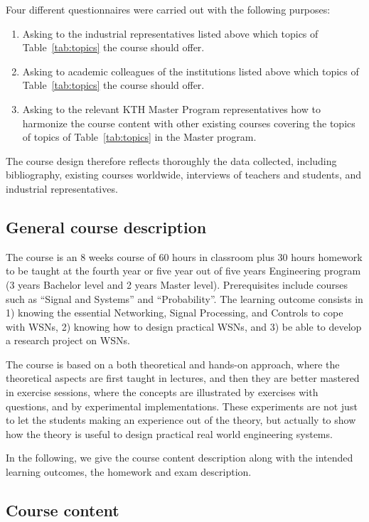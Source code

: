 \documentclass[onecolumn,12pt,draftclsnofoot,a4paper,peerreview]{IEEEtran}
\begin{document}
Four different questionnaires were carried out with the following purposes:
\begin{enumerate}
\item Asking to the industrial representatives listed above which topics of Table~\ref{tab:topics} the course should offer.
\item Asking to academic colleagues of the institutions listed above which topics of Table~\ref{tab:topics} the course should offer.
\item	 Asking to the relevant KTH Master Program representatives how to harmonize the course content with other existing courses covering the topics of topics of Table~\ref{tab:topics} in the Master program. 
\end{enumerate}

The course design therefore reflects thoroughly the data collected, including bibliography, existing courses worldwide, interviews of teachers and students, and industrial representatives. 

\subsection{General course description} \label{course-description}

The course is an 8 weeks course of 60 hours in classroom plus 30 hours homework to be taught at the fourth year or five year out of five years Engineering program (3 years Bachelor level and 2 years Master level). Prerequisites include courses such as ``Signal and Systems'' and ``Probability''. The learning outcome consists in 1) knowing the essential Networking, Signal Processing, and Controls to cope with WSNs, 2) knowing how to design practical WSNs, and 3) be able to develop a research project on WSNs. 

The course is based on a both theoretical and hands-on approach, where the theoretical aspects are first taught in lectures, and then they are better mastered in exercise sessions, where the concepts are illustrated by exercises with questions, and by experimental implementations. These experiments are not just to let the students making an experience out of the theory, but actually to show how the theory is useful to design practical real world engineering systems. 

In the following, we give the course content description along with the intended learning outcomes, the homework and exam description.  


\subsection{Course content} \label{course-content}
\end{document}

